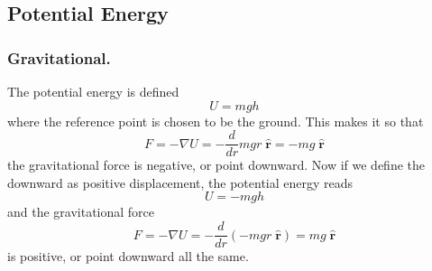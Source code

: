 \documentclass[../../../main.tex]{subfiles}
\begin{document}
\subsection{Potential Energy}
\subsubsection{Gravitational.} 
The potential energy is defined 
\begin{equation*}
    U=mgh
\end{equation*}
where the reference point is chosen to be the ground.
This makes it so that 
\begin{equation*}
    F=-\nabla U=-\frac{d}{dr}mgr\;\mathbf{\hat{r}}=-mg\;\mathbf{\hat{r}}
\end{equation*}
the gravitational force is negative, or point downward.
Now if we define the downward as positive displacement, the potential energy reads
\begin{equation*}
    U=-mgh
\end{equation*}
and the gravitational force
\begin{equation*}
    F=-\nabla U=-\frac{d}{dr}\left(-mgr\;\mathbf{\hat{r}}\right)=mg\;\mathbf{\hat{r}} 
\end{equation*}
is positive, or point downward all the same.
\end{document}
